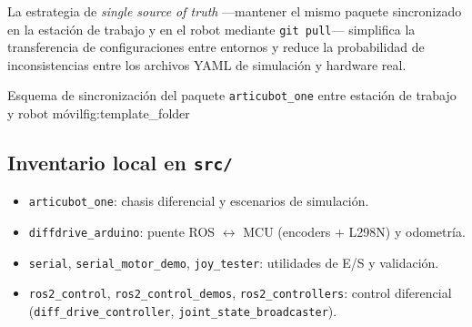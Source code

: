 La estrategia de \textit{single source of truth} —mantener el mismo paquete sincronizado en la estación de trabajo y en el robot mediante \texttt{git pull}— simplifica la transferencia de configuraciones entre entornos y reduce la probabilidad de inconsistencias entre los archivos YAML de simulación y hardware real.

{Esquema de sincronización del paquete \texttt{articubot\_one} entre estación de trabajo y robot móvil}{fig:template_folder}

\subsection{Inventario local en \texttt{src/}}
\begin{itemize}
  \item \texttt{articubot\_one}: chasis diferencial y escenarios de simulación.
  \item \texttt{diffdrive\_arduino}: puente ROS $\leftrightarrow$ MCU (encoders + L298N) y odometría.
  \item \texttt{serial}, \texttt{serial\_motor\_demo}, \texttt{joy\_tester}: utilidades de E/S y validación.
  \item \texttt{ros2\_control}, \texttt{ros2\_control\_demos}, \texttt{ros2\_controllers}: control diferencial (\texttt{diff\_drive\_controller}, \texttt{joint\_state\_broadcaster}).
\end{itemize}

